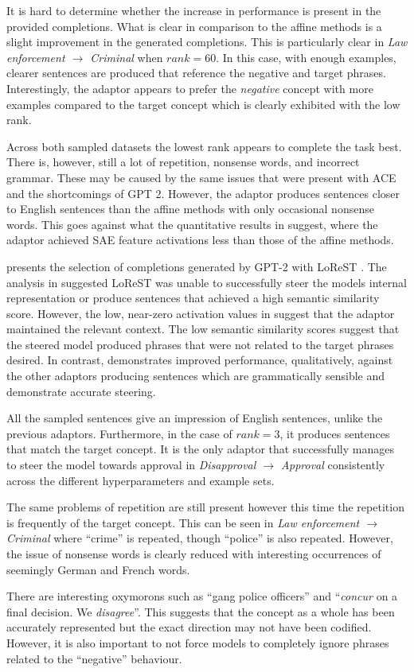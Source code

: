 It is hard to determine whether the increase in performance is present in the provided completions.
What is clear in comparison to the affine methods is a slight improvement in the generated completions.
This is particularly clear in \emph{Law enforcement $\to$ Criminal} when $rank = 60$.
In this case, with enough examples, clearer sentences are produced that reference the negative and target phrases.
Interestingly, the adaptor appears to prefer the \emph{negative} concept with more examples compared to the target concept which is clearly exhibited with the low rank.

Across both sampled datasets the lowest rank appears to complete the task best.
There is, however, still a lot of repetition, nonsense words, and incorrect grammar.
These may be caused by the same issues that were present with ACE and the shortcomings of GPT 2.
However, the adaptor produces sentences closer to English sentences than the affine methods with only occasional nonsense words.
This goes against what the quantitative results in  suggest, where the adaptor achieved SAE feature activations less than those of the affine methods.




 presents the selection of completions generated by GPT-2 with LoReST \citep{steering-clear}.
The analysis in  suggested LoReST was unable to successfully steer the models internal representation or produce sentences that achieved a high semantic similarity score.
However, the low, near-zero activation values in  suggest that the adaptor maintained the relevant context.
The low semantic similarity scores suggest that the steered model produced phrases that were not related to the target phrases desired.
In contrast,  demonstrates improved performance, qualitatively, against the other adaptors producing sentences which are grammatically sensible and demonstrate accurate steering.

All the sampled sentences give an impression of English sentences, unlike the previous adaptors.
Furthermore, in the case of $rank = 3$, it produces sentences that match the target concept.
It is the only adaptor that successfully manages to steer the model towards approval in \emph{Disapproval $\to$ Approval} consistently across the different hyperparameters and example sets.

The same problems of repetition are still present however this time the repetition is frequently of the target concept.
This can be seen in \emph{Law enforcement $\to$ Criminal} where ``crime'' is repeated, though ``police'' is also repeated.
However, the issue of nonsense words is clearly reduced with interesting occurrences of seemingly German and French words.

There are interesting oxymorons such as ``gang police officers'' and ``\emph{concur} on a final decision. We \emph{disagree}''.
This suggests that the concept as a whole has been accurately represented but the exact direction may not have been codified.
However, it is also important to not force models to completely ignore phrases related to the ``negative'' behaviour.
